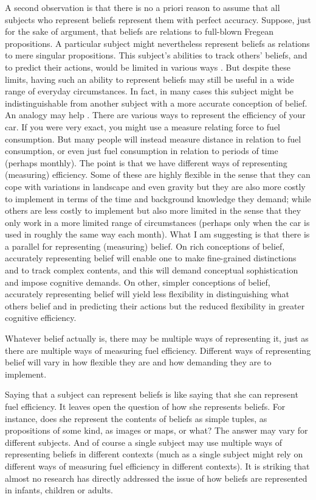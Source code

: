 \documentclass[12pt,\papersize]{extarticle}
\begin{document}
A second observation is that there is no a priori reason to assume that all subjects who represent beliefs represent them with perfect accuracy.
Suppose, just for the sake of argument, that beliefs are relations to full-blown Fregean propositions.
A particular subject might nevertheless  represent beliefs as  relations to mere singular propositions.
This subject's abilities to track others' beliefs, and to predict their actions, would be limited in various ways \citep{Salmon:1986fk}.
But despite these limits, having such an ability to represent beliefs may still be useful in a wide range of everyday circumstances.
In fact, in many cases this subject might be indistinguishable from another subject with a more accurate conception of belief.
An analogy may help \citep[this is based on][]{matthews:2007_measure}.
There are various ways to represent the efficiency of your car.
If you were very exact, you might use a measure relating force to fuel consumption.
But many people will instead measure distance in relation to fuel consumption,
or even just fuel consumption in relation to periods of time (perhaps monthly).
The point is that we have different ways of representing (measuring) efficiency.
Some of these are highly flexible in the sense that they can cope with variations in landscape and even gravity but they are also more costly to implement in terms of the time and background knowledge they demand;
while others are less costly to implement but also more limited in the sense that they only work in a more limited range of circumstances (perhaps only when the car is used in roughly the same way each month).
What I am suggesting is that there is a parallel for representing (measuring) belief.
On rich conceptions of belief, accurately representing belief will enable one to make fine-grained distinctions and to track complex contents, and this will demand conceptual sophistication and impose cognitive demands.
On other, simpler conceptions of belief, accurately representing belief will yield less flexibility in distinguishing what others belief and in predicting their actions but the reduced flexibility in greater cognitive efficiency.

Whatever belief actually is, 
there may be multiple ways of representing it,
just as there are multiple ways of measuring fuel efficiency.
Different ways of representing belief will vary in how flexible they are and how demanding they are to implement.

Saying that a subject can represent beliefs is like saying that she can represent fuel efficiency.
It leaves open the question of how she represents beliefs.
For instance, does she represent the contents of beliefs as simple tuples, as propositions of some kind, as images or maps, or what?
The answer may vary for different subjects.
And of course a single subject may use multiple ways of representing beliefs in different contexts (much as a single subject might rely on different ways of measuring fuel efficiency in different contexts).
It is striking that almost no research has directly addressed the issue of how beliefs are represented in infants, children or adults.
\end{document}
